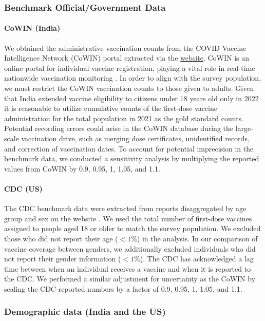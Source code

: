 \documentclass{article}
\begin{document}
\subsubsection{Benchmark Official/Government Data}

\paragraph{CoWIN (India)}  We obtained the administrative vaccination counts from the COVID Vaccine Intelligence Network (CoWIN) portal extracted via the \href{https://data.covid19bharat.org}{website}. CoWIN is an online portal for individual vaccine registration, playing a vital role in real-time nationwide vaccination monitoring \citep{GovernmentOfIndia}. In order to align with the survey population, we must restrict the CoWIN vaccination counts to those given to adults. Given that India extended vaccine eligibility to citizens under 18 years old only in 2022 \citep{TimesOfIndia2021} it is reasonable to utilize cumulative counts of the first-dose vaccine administration for the total population in 2021 as the gold standard counts. Potential recording errors could arise in the CoWIN database during the large-scale vaccination drive, such as merging dose certificates, unidentified records, and correction of vaccination dates. To account for potential imprecision in the benchmark data, we conducted a sensitivity analysis by multiplying the reported values from CoWIN by 0.9, 0.95, 1, 1.05, and 1.1. 

\paragraph{CDC (US)} The CDC benchmark data were extracted from reports disaggregated by age group and sex on the website \citep{CDC2023}. We used the total number of first-dose vaccines assigned to people aged 18 or older to match the survey population. We excluded those who did not report their age ($<1\%$) in the analysis. In our comparison of vaccine coverage between genders, we additionally excluded individuals who did not report their gender information ($<1\%$). The CDC has acknowledged a lag time between when an individual receives a vaccine and when it is reported to the CDC. We performed a similar adjustment for uncertainty as the CoWIN by scaling the CDC-reported numbers by a factor of 0.9, 0.95, 1, 1.05, and 1.1.

\subsubsection{Demographic data (India and the US)}
\end{document}
